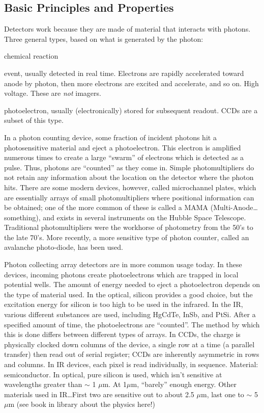 \documentclass[12pt]{article}
\begin{document}
\subsection{Basic Principles and Properties}
Detectors work because they are made of material that interacts
with photons. Three general types, based on what is generated
by the photon:
\begin{description}[labelwidth=10em, leftmargin=12em]
    \item [Photographic detector] chemical reaction
    \item [Photomultiplier/photon counter] event, usually detected
        in real time. Electrons are rapidly accelerated toward anode
        by photon, then more electrons are excited and accelerate, and
        so on. High voltage. These are \emph{not} imagers.
    \item [Photon collecter] photoelectron, usually (electronically)
        stored for subsequent readout. CCDs are a subset of this type.
\end{description}

In a photon counting device, some fraction of incident photons hit a
photosensitive material and eject a photoelectron. This electron is
amplified numerous times to create a large ``swarm'' of electrons
which is detected as a pulse. Thus, photons are ``counted'' as they
come in. Simple photomultipliers do not retain any information about
the location on the detector where the photon hits. There are some
modern devices, however, called microchannel plates, which are
essentially arrays of small photomultipliers where positional
information can be obtained; one of the more common of these is called
a MAMA (Multi-Anode\ldots something),
and exists in several instruments on the Hubble Space
Telescope. Traditional photomultipliers were the workhorse of
photometry from the 50's to the late 70's. More recently, a more
sensitive type of photon counter, called an avalanche photo-diode, has
been used.

Photon collecting array detectors are in more common usage today. In
these devices, incoming photons create photoelectrons which are
trapped in local potential wells. The amount of energy needed to eject
a photoelectron depends on the type of material used. In the optical,
silicon provides a good choice, but the excitation energy for silicon
is too high to be used in the infrared. In the IR, various different
substances are used, including HgCdTe, InSb, and PtSi. After a
specified amount of time, the photoelectrons are ``counted''. The
method by which this is done differs between different types of
arrays. In CCDs, the charge is physically clocked down columns of the
device, a single row at a time (a parallel transfer) then read out of
serial register; CCDs are inherently asymmetric in rows and columns.
In IR devices, each pixel is read individually, in sequence.
\textcolor{myBlue}{Material: semiconductor. In optical, pure silicon
is used, which isn't sensitive at wavelengths greater than $\sim$
1 $\mu$m. At 1$\mu$m, ``barely'' enough energy. Other materials used
in IR\ldots First two are sensitive out to about 2.5 $\mu$m, last one
to $\sim$ 5 $\mu$m (see book in library about the physics here!)}
\end{document}
